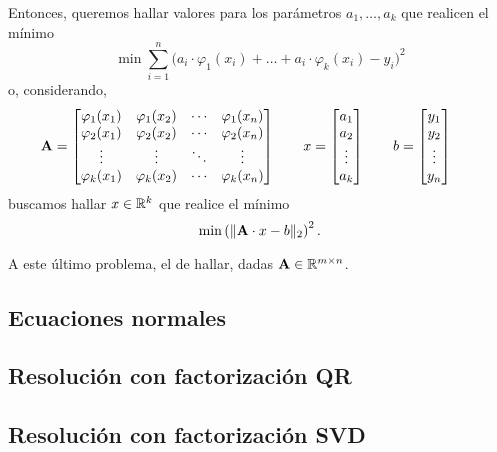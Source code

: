 Entonces, queremos hallar valores para los parámetros $a_1, \dots, a_k$ que
realicen el mínimo
\[ \min  \sum_{i=1}^{n} \big( a_i \cdot \varphi_1(x_i)
    + \dots + a_i \cdot \varphi_k(x_i) - y_i \big)^2 \]
o, considerando,
\[ \mathbf{A} = \begin{bmatrix}
    \varphi_1(x_1) & \varphi_1(x_2) & \cdots & \varphi_1(x_n) \\
    \varphi_2(x_1) & \varphi_2(x_2) & \cdots & \varphi_2(x_n) \\
    \vdots         & \vdots         & \ddots & \vdots \\
    \varphi_k(x_1) & \varphi_k(x_2) & \cdots & \varphi_k(x_n) 
\end{bmatrix} \qquad
x = \begin{bmatrix}
    a_1 \\ a_2 \\ \vdots \\ a_k
\end{bmatrix} \qquad
b = \begin{bmatrix}
    y_1 \\ y_2 \\ \vdots \\ y_n
\end{bmatrix} \qquad \]
buscamos hallar $x \in \mathbb{R}^k$ que realice el mínimo
\[ \min \left(\Vert \mathbf{A} \cdot x - b \Vert_2\right)^2. \]

A este último problema, el de hallar, dadas $\mathbf{A} \in \mathbb{R}^{m \times n}$.

\subsection{Ecuaciones normales}

\subsection{Resolución con factorización QR}
\subsection{Resolución con factorización SVD}
